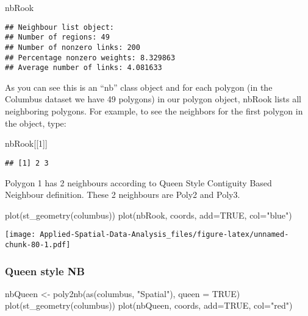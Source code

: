 \documentclass[
]{book}
\newenvironment{Shaded}{\begin{snugshade}}{\end{snugshade}}
\newcommand{\AttributeTok}[1]{\textcolor[rgb]{0.77,0.63,0.00}{#1}}
\newcommand{\ConstantTok}[1]{\textcolor[rgb]{0.00,0.00,0.00}{#1}}
\newcommand{\DecValTok}[1]{\textcolor[rgb]{0.00,0.00,0.81}{#1}}
\newcommand{\FunctionTok}[1]{\textcolor[rgb]{0.00,0.00,0.00}{#1}}
\newcommand{\NormalTok}[1]{#1}
\newcommand{\OtherTok}[1]{\textcolor[rgb]{0.56,0.35,0.01}{#1}}
\newcommand{\StringTok}[1]{\textcolor[rgb]{0.31,0.60,0.02}{#1}}
\begin{document}
\begin{Shaded}
\begin{Highlighting}[]
\NormalTok{nbRook}
\end{Highlighting}
\end{Shaded}

\begin{verbatim}
## Neighbour list object:
## Number of regions: 49 
## Number of nonzero links: 200 
## Percentage nonzero weights: 8.329863 
## Average number of links: 4.081633
\end{verbatim}

As you can see this is an ``nb'' class object and for each polygon (in the Columbus dataset we have 49 polygons) in our polygon object, nbRook lists all neighboring polygons. For example, to see the neighbors for the first polygon in the object, type:

\begin{Shaded}
\begin{Highlighting}[]
\NormalTok{nbRook[[}\DecValTok{1}\NormalTok{]]}
\end{Highlighting}
\end{Shaded}

\begin{verbatim}
## [1] 2 3
\end{verbatim}

Polygon 1 has 2 neighbours according to Queen Style Contiguity Based Neighbour definition. These 2 neighbours are Poly2 and Poly3.

\begin{Shaded}
\begin{Highlighting}[]
\FunctionTok{plot}\NormalTok{(}\FunctionTok{st\_geometry}\NormalTok{(columbus))}
\FunctionTok{plot}\NormalTok{(nbRook, coords, }\AttributeTok{add=}\ConstantTok{TRUE}\NormalTok{, }\AttributeTok{col=}\StringTok{"blue"}\NormalTok{)}
\end{Highlighting}
\end{Shaded}

\texttt{[image: Applied-Spatial-Data-Analysis\_files/figure-latex/unnamed-chunk-80-1.pdf]}

\hypertarget{queen-style-nb}{%
\subsubsection{Queen style NB}\label{queen-style-nb}}

\begin{Shaded}
\begin{Highlighting}[]
\NormalTok{nbQueen }\OtherTok{\textless{}{-}} \FunctionTok{poly2nb}\NormalTok{(}\FunctionTok{as}\NormalTok{(columbus, }\StringTok{"Spatial"}\NormalTok{), }\AttributeTok{queen =} \ConstantTok{TRUE}\NormalTok{)}
\FunctionTok{plot}\NormalTok{(}\FunctionTok{st\_geometry}\NormalTok{(columbus))}
\FunctionTok{plot}\NormalTok{(nbQueen, coords, }\AttributeTok{add=}\ConstantTok{TRUE}\NormalTok{, }\AttributeTok{col=}\StringTok{"red"}\NormalTok{)}
\end{Highlighting}
\end{Shaded}
\end{document}
